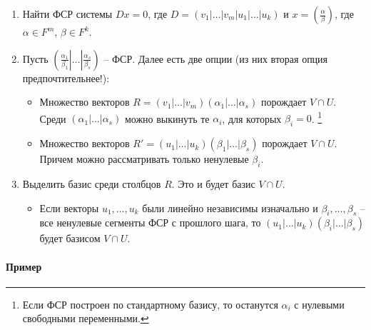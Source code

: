 \documentclass{article}
\begin{document}
\begin{enumerate}
\item Найти ФСР системы $D x = 0$, где $D = (v_1|\ldots|v_m|u_1|\ldots|u_k)$ и $x = \left(\frac{\alpha}{\beta}\right)$, где $\alpha\in F^{m}$, $\beta\in F^{k}$.

\item Пусть $\left(\left.\left.\frac{\alpha_1}{\beta_1}\right|\ldots\right|\frac{\alpha_s}{\beta_s}\right)$ -- ФСР.
Далее есть две опции (из них вторая опция предпочтительнее!):
\begin{itemize}
\item Множество векторов $R = (v_1|\ldots|v_m)(\alpha_1|\ldots|\alpha_s)$ порождает $V\cap U$.
Среди $(\alpha_1|\ldots|\alpha_s)$ можно выкинуть те $\alpha_i$, для которых $\beta_i = 0$.%
\footnote{Если ФСР построен по стандартному базису, то останутся $\alpha_i$ с нулевыми свободными переменными.}

\item Множество векторов $R' = (u_1|\ldots|u_k)(\beta_1|\ldots|\beta_s)$ порождает  $V\cap U$.
Причем можно рассматривать только ненулевые $\beta_i$.
\end{itemize}

\item Выделить базис среди столбцов $R$.
Это и будет базис $V\cap U$.
\begin{itemize}
\item Если векторы $u_1,\ldots,u_k$ были линейно независимы изначально и $\beta_i,\ldots,\beta_s$ -- все ненулевые сегменты ФСР с прошлого шага, то $(u_1|\ldots|u_k)(\beta_i|\ldots|\beta_s)$ будет базисом $V\cap U$.
\end{itemize}
\end{enumerate}

\paragraph{Пример}
\end{document}
